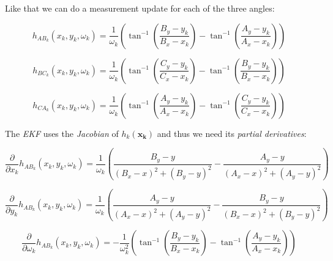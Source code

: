 \documentclass[a4paper, 12pt]{paper}
\begin{document}
Like that we can do a measurement update for each of the three angles:

\begin{equation}
    h_{AB_k}\left(x_k, y_k, \omega_k\right)
        = \frac{1}{\omega_k}\left(\tan^{-1}\left(\frac{B_y-y_k}{B_x-x_k}\right)
        - \tan^{-1}\left(\frac{A_y-y_k}{A_x-x_k}\right)\right)
    \label{eq:h_ab}
\end{equation}

\begin{equation}
    h_{BC_k}\left(x_k, y_k, \omega_k\right)
        = \frac{1}{\omega_k}\left(\tan^{-1}\left(\frac{C_y-y_k}{C_x-x_k}\right)
        - \tan^{-1}\left(\frac{B_y-y_k}{B_x-x_k}\right)\right)
    \label{eq:h_bc}
\end{equation}

\begin{equation}
    h_{CA_k}\left(x_k, y_k, \omega_k\right)
    = \frac{1}{\omega_k}\left(\tan^{-1}\left(\frac{A_y-y_k}{A_x-x_k}\right)
        - \tan^{-1}\left(\frac{C_y-y_k}{C_x-x_k}\right)\right)
    \label{eq:h_ca}
\end{equation}

The \emph{EKF} uses the \emph{Jacobian} of $h_k\left(\mathbf{x_k}\right)$ and
thus we need its \emph{partial derivatives}:

\begin{equation}
    \frac{\partial}{\partial x_k}h_{AB_k}\left(x_k, y_k, \omega_k\right)
        = \frac{1}{\omega_k}\left(
        \frac{B_y-y}{{\left(B_x-x\right)}^2+{\left(B_y-y\right)}^2}
        - \frac{A_y-y}{{\left(A_x-x\right)}^2+{\left(A_y-y\right)}^2}\right)
    \label{eq:partial_x}
\end{equation}

\begin{equation}
    \frac{\partial}{\partial y_k}h_{AB_k}\left(x_k, y_k, \omega_k\right)
        = \frac{1}{\omega_k}\left(
        \frac{A_y-y}{{\left(A_x-x\right)}^2+{\left(A_y-y\right)}^2}
        - \frac{B_y-y}{{\left(B_x-x\right)}^2+{\left(B_y-y\right)}^2}\right)
    \label{eq:partial_y}
\end{equation}

\begin{equation}
    \frac{\partial}{\partial \omega_k}h_{AB_k}\left(x_k, y_k, \omega_k\right)
        = - \frac{1}{\omega_k^2}
        \left(\tan^{-1}\left(\frac{B_y-y_k}{B_x-x_k}\right)
        - \tan^{-1}\left(\frac{A_y-y_k}{A_x-x_k}\right)\right)
    \label{eq:partial_omega}
\end{equation}
\end{document}
